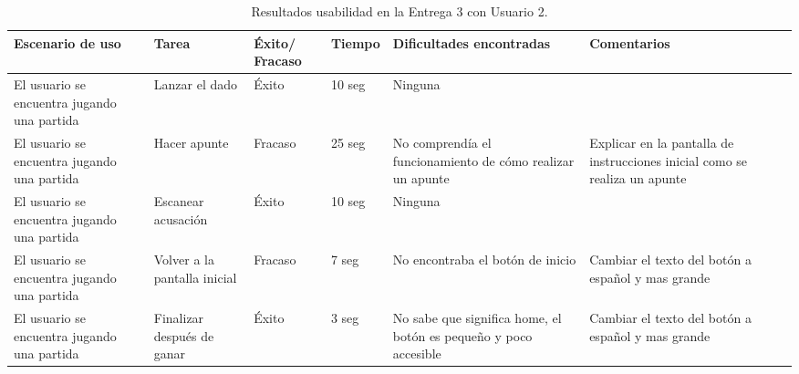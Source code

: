 \begin{table}[h]
  \begin{center}
    \begin{tabular}{|p{2.5cm}|p{1.75cm}|p{1.25cm}|p{1.25cm}|p{2.75cm}|p{3.5cm}|}

      \hline
        \rowcolor{Gray} \textbf{Escenario de uso}
        & \textbf{Tarea}
        & \textbf{Éxito/ Fracaso}
        & \textbf{Tiempo}
        & \textbf{Dificultades encontradas}
        & \textbf{Comentarios}\\

      \hline
      El usuario se encuentra jugando una partida
      & Lanzar el dado
      & Éxito
      & 10 seg
      & Ninguna
      & \\

      \hline
      El usuario se encuentra jugando una partida
      & Hacer apunte
      & Fracaso
      & 25 seg
      & No comprendía el funcionamiento de cómo realizar un apunte
      & Explicar en la pantalla de instrucciones inicial como se realiza un apunte\\

      \hline
      El usuario se encuentra jugando una partida
      & Escanear acusación
      & Éxito
      & 10 seg
      & Ninguna
      &\\

      \hline
      El usuario se encuentra jugando una partida
      & Volver a la pantalla inicial
      & Fracaso
      & 7 seg
      & No encontraba el botón de inicio
      & Cambiar el texto del botón a español y mas grande\\

      \hline
      El usuario se encuentra jugando una partida
      & Finalizar después de ganar
      & Éxito
      & 3 seg
      & No sabe que significa home, el botón es pequeño y poco accesible
      & Cambiar el texto del botón a español y mas grande\\

      \hline

    \end{tabular}

    \caption{Resultados usabilidad en la Entrega 3 con Usuario 2.}
    \label{tabla-entrega-3-usuario2}

  \end{center}
\end{table}


